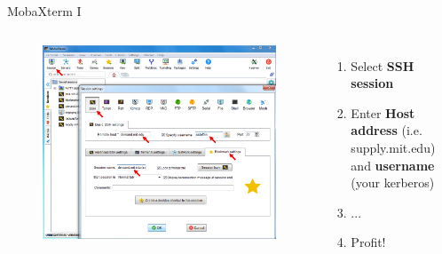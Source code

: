 \documentclass{beamer}
\begin{document}
\begin{frame}{MobaXterm I}
    \begin{columns}[c]
        \begin{figure}
        \includegraphics[width=1.0\linewidth]{resources/01_mobaxterm.png}
        \end{figure}
            \begin{enumerate}
                \item Select \textbf{SSH session}
                \item Enter \textbf{Host address} (i.e. supply.mit.edu) and \textbf{username} (your kerberos)
                \item ...
                \item Profit!
            \end{enumerate}
    \end{columns}
\end{frame}
\end{document}
